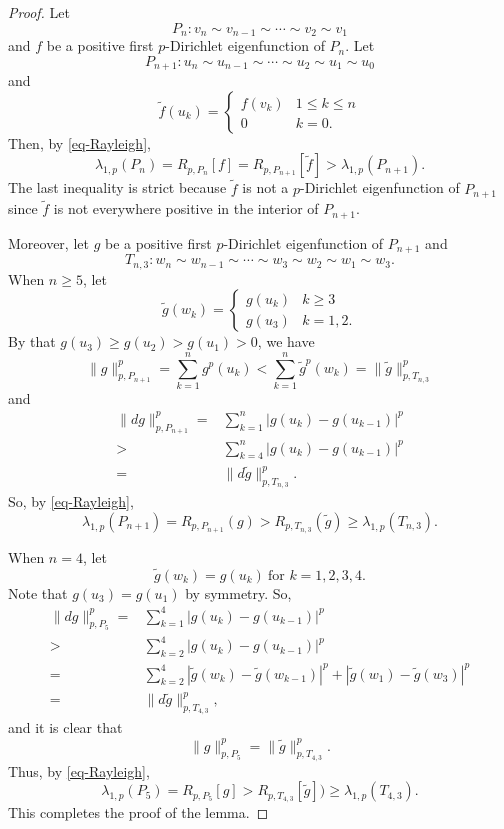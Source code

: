 \documentclass[12pt]{amsart}
\def\wt{\widetilde}
\theoremstyle{definition}
\theoremstyle{remark}
\numberwithin{equation}{section}
\begin{document}
\begin{proof}
Let
$$P_n:v_n\sim v_{n-1}\sim\cdots\sim v_2\sim v_1$$
and $f$ be a positive first $p$-Dirichlet eigenfunction of $P_n$. Let
$$P_{n+1}: u_{n}\sim u_{n-1}\sim\cdots\sim u_2\sim u_1\sim u_0$$
and
$$\wt f(u_k)=\left\{\begin{array}{ll}f(v_k)&1\leq k\leq n\\
0&k=0.
\end{array}\right.$$
Then, by \eqref{eq-Rayleigh},
$$\lambda_{1,p}(P_n)=R_{p,P_n}[f]=R_{p,P_{n+1}}[\wt f]>\lambda_{1,p}(P_{n+1}).$$
The last inequality is strict because $\wt f$ is not a $p$-Dirichlet eigenfunction of $P_{n+1}$ since $\wt f$ is not everywhere positive in the interior of $P_{n+1}$.

Moreover, let $g$ be a positive first $p$-Dirichlet eigenfunction of $P_{n+1}$ and
$$T_{n,3}: w_n\sim w_{n-1}\sim\cdots\sim w_3\sim w_2\sim w_1\sim w_3.$$
When $n\geq 5$, let
\begin{equation}
\wt g(w_k)=\left\{\begin{array}{ll}g(u_k)&k\geq 3\\
g(u_3)&k=1,2.
\end{array}\right.
\end{equation}
By that $g(u_3)\geq g(u_2)>g(u_1)>0$, we have
\begin{equation*}
\|g\|_{p,P_{n+1}}^p=\sum_{k=1}^ng^p(u_k)<\sum_{k=1}^n \wt g^p(w_k)=\|\wt g\|_{p,T_{n,3}}^p
\end{equation*}
and
\begin{equation*}
\begin{split}
\|dg\|_{p,P_{n+1}}^p=&\sum_{k=1}^{n}|g(u_{k})-g(u_{k-1})|^p\\
>&\sum_{k=4}^{n}|g(u_k)-g(u_{k-1})|^p\\
=&\|d\wt g\|_{p,T_{n,3}}^p.
\end{split}
\end{equation*}
So, by \eqref{eq-Rayleigh},
$$\lambda_{1,p}(P_{n+1})=R_{p,P_{n+1}}(g)>R_{p,T_{n,3}}(\wt g)\geq \lambda_{1,p}(T_{n,3}).$$

When $n=4$, let
\begin{equation*}
\wt g(w_k)=g(u_k)\ \mbox{for $k=1,2,3,4.$}
\end{equation*}
Note that $g(u_3)=g(u_1)$ by symmetry. So,
\begin{equation*}
\begin{split}
\|dg\|_{p,P_5}^p=&\sum_{k=1}^4|g(u_k)-g(u_{k-1})|^p\\
>&\sum_{k=2}^4|g(u_k)-g(u_{k-1})|^p\\
=&\sum_{k=2}^4|\wt g(w_k)-\wt g(w_{k-1})|^p+|\wt g(w_1)-\wt g(w_3)|^p\\
=&\|d\wt g\|_{p,T_{4,3}}^p,
\end{split}
\end{equation*}
and it is clear that
$$\|g\|_{p,P_5}^p=\|\wt g\|_{p,T_{4,3}}^p.$$
Thus, by \eqref{eq-Rayleigh},
$$\lambda_{1,p}(P_{5})=R_{p,P_{5}}[g]>R_{p,T_{4,3}}[\wt g])\geq\lambda_{1,p}(T_{4,3}).$$
This completes the proof of the lemma.
\end{proof}
\end{document}

